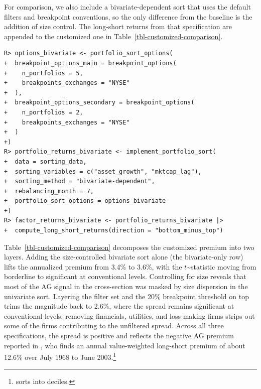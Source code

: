 \documentclass[
  article]{jss}
\begin{document}
For comparison, we also include a bivariate-dependent sort that uses the
default filters and breakpoint conventions, so the only difference from
the baseline is the addition of size control. The long-short returns
from that specification are appended to the customized one in
Table~\ref{tbl-customized-comparison}.

\begin{verbatim}
R> options_bivariate <- portfolio_sort_options(
+  breakpoint_options_main = breakpoint_options(
+    n_portfolios = 5,
+    breakpoints_exchanges = "NYSE"
+  ),
+  breakpoint_options_secondary = breakpoint_options(
+    n_portfolios = 2,
+    breakpoints_exchanges = "NYSE"
+  )
+)
R> portfolio_returns_bivariate <- implement_portfolio_sort(
+  data = sorting_data,
+  sorting_variables = c("asset_growth", "mktcap_lag"),
+  sorting_method = "bivariate-dependent",
+  rebalancing_month = 7,
+  portfolio_sort_options = options_bivariate
+)
R> factor_returns_bivariate <- portfolio_returns_bivariate |>
+  compute_long_short_returns(direction = "bottom_minus_top")
\end{verbatim}

Table~\ref{tbl-customized-comparison} decomposes the customized premium
into two layers. Adding the size-controlled bivariate sort alone (the
bivariate-only row) lifts the annualized premium from 3.4\% to 3.6\%,
with the \(t\)\textasciitilde statistic moving from borderline to
significant at conventional levels. Controlling for size reveals that
most of the AG signal in the cross-section was masked by size dispersion
in the univariate sort. Layering the filter set and the 20\% breakpoint
threshold on top trims the magnitude back to 2.6\%, where the spread
remains significant at conventional levels: removing financials,
utilities, and loss-making firms strips out some of the firms
contributing to the unfiltered spread. Across all three specifications,
the spread is positive and reflects the negative AG premium reported in
\citet{cooper.2008}, who finds an annual value-weighted long-short
premium of about 12.6\% over July 1968 to June 2003.\footnote{\citet{cooper.2008}
  sorts into deciles.}

\begingroup
\small
\end{document}
